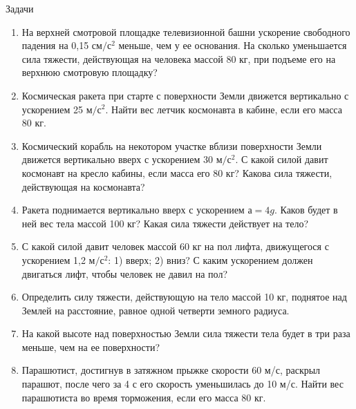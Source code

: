\documentclass[a6paper, 11pt]{diss_4}
\renewcommand{\'}{\,'}
\begin{document}
\begin{center}
   Задачи
\end{center}
\begin{enumerate}

\item На верхней смотровой площадке  телевизионной башни ускорение свободного падения на 0,15 $см/с^2$ меньше, чем у ее основания. На сколько уменьшается сила тяжести, действующая на человека массой 80 кг, при подъеме его на верхнюю смотровую площадку?

\item Космическая ракета при старте с поверхности Земли движется вертикально с ускорением 25 $м/с^2$. Найти вес летчик космонавта в кабине, если его масса 80 кг.

\item Космический корабль на некотором участке вблизи поверхности Земли движется вертикально вверх с ускорением 30 $м/с^2$. С какой силой давит космонавт на кресло кабины, если масса его 80 кг? Какова сила тяжести, действующая на космонавта?

\item Ракета поднимается вертикально вверх с ускорением $а = 4g$. Каков будет в ней вес тела массой 100 кг? Какая сила тяжести действует на тело?

\item С какой силой давит человек массой 60 кг на пол лифта, движущегося с ускорением 1,2 $м/с^2$: 1) вверх; 2) вниз? С каким ускорением должен двигаться лифт, чтобы человек не давил на пол?

\item Определить силу тяжести, действующую на тело массой 10 кг, поднятое над Землей на расстояние, равное одной четверти земного радиуса.

\item На какой высоте над поверхностью Земли сила тяжести тела будет в три раза меньше, чем на ее поверхности?

\item Парашютист, достигнув в затяжном прыжке скорости 60 м/с, раскрыл парашют, после чего за 4 с его скорость уменьшилась до 10 м/с. Найти вес парашютиста во время торможения, если его масса 80 кг.

\end{enumerate}
\end{document}
